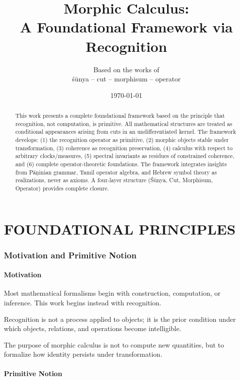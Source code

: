 \documentclass[12pt, oneside]{article}
\title{Morphic Calculus: \\ A Foundational Framework via Recognition}
\author{Based on the works of \\ [0.5cm] \Large{śūnya -- cut -- morphisum -- operator}}
\date{\today}
\begin{document}
\maketitle

\begin{abstract}
This work presents a complete foundational framework based on the principle that recognition, not computation, is primitive. All mathematical structures are treated as conditional appearances arising from cuts in an undifferentiated kernel. The framework develops: (1) the recognition operator as primitive, (2) morphic objects stable under transformation, (3) coherence as recognition preservation, (4) calculus with respect to arbitrary clocks/measures, (5) spectral invariants as residues of constrained coherence, and (6) complete operator-theoretic foundations. The framework integrates insights from Pāṇinian grammar, Tamil operator algebra, and Hebrew symbol theory as realizations, never as axioms. A four-layer structure (Śūnya, Cut, Morphisum, Operator) provides complete closure.
\end{abstract}

\tableofcontents

\newpage

\part{FOUNDATIONAL PRINCIPLES}

\section{Motivation and Primitive Notion}

\subsection{Motivation}

Most mathematical formalisms begin with construction, computation, or inference. This work begins instead with recognition.

Recognition is not a process applied to objects; it is the prior condition under which objects, relations, and operations become intelligible.

The purpose of morphic calculus is not to compute new quantities, but to formalize how identity persists under transformation.

\subsection{Primitive Notion}
\end{document}
